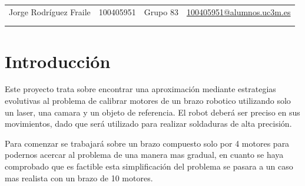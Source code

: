 \documentclass[12pt, spanish, pdftex]{UC3M_document}
\author{Jorge Rodríguez Fraile}
\begin{document}
\begin{titlepage}
	
	\begin{table}[b]
		\centering
		\begin{tabular}{ cccc }
			\large Jorge Rodríguez Fraile & \large 100405951 & \large Grupo 83 & \href{mailto:100405951@alumnos.uc3m.es}{\large 100405951@alumnos.uc3m.es} \\
			                              &                  &                 &                                                                           \\
			                              &                  &                 &                                                                           \\
		\end{tabular}
	\end{table}
	
\end{titlepage}

\newpage

\begin{spacing}{0.5}
	\hypersetup{linkcolor=black}    %
	\tableofcontents\newpage        %
	\listoffigures\newpage          %
	\listoftables\newpage           %
\end{spacing}


\section{Introducción}
Este proyecto trata sobre encontrar una aproximación mediante estrategias evolutivas al problema de calibrar motores de un brazo robotico utilizando solo un laser, una camara y un objeto de referencia. El robot deberá ser preciso en sus movimientos, dado que será utilizado para realizar soldaduras de alta precisión.

Para comenzar se trabajará sobre un brazo compuesto solo por 4 motores para podernos acercar al problema de una manera mas gradual, en cuanto se haya comprobado que es factible esta simplificación del problema se pasara a un caso mas realista con un brazo de 10 motores.
\end{document}
